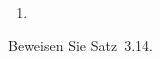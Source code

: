\bigskip

\begin{lsg}\mbox{ }
\begin{enumerate}[label=$\mathrm{(\roman*)}$, ref=$\mathrm{\roman*}$]
\item
\end{enumerate}
\end{lsg}

\bigskip


\begin{aufg}[6 Punkte]
Beweisen Sie Satz~3.14.
\end{aufg}
 
\bigskip

\begin{lsg}
\end{lsg}

